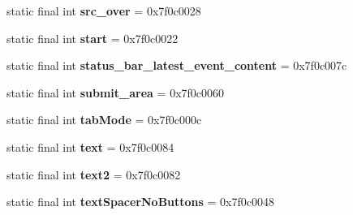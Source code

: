 \begin{DoxyCompactItemize}
\item 
\hypertarget{classandroid_1_1support_1_1design_1_1_r_1_1id_a736f123ee86e4183fcfb8bd3022ba9b8}{}static final int {\bfseries src\+\_\+over} = 0x7f0c0028\label{classandroid_1_1support_1_1design_1_1_r_1_1id_a736f123ee86e4183fcfb8bd3022ba9b8}

\item 
\hypertarget{classandroid_1_1support_1_1design_1_1_r_1_1id_a0d737859bafd47bd0319c24213bf40ba}{}static final int {\bfseries start} = 0x7f0c0022\label{classandroid_1_1support_1_1design_1_1_r_1_1id_a0d737859bafd47bd0319c24213bf40ba}

\item 
\hypertarget{classandroid_1_1support_1_1design_1_1_r_1_1id_a64ae3efa15896f2f8faa162f61413ed1}{}static final int {\bfseries status\+\_\+bar\+\_\+latest\+\_\+event\+\_\+content} = 0x7f0c007c\label{classandroid_1_1support_1_1design_1_1_r_1_1id_a64ae3efa15896f2f8faa162f61413ed1}

\item 
\hypertarget{classandroid_1_1support_1_1design_1_1_r_1_1id_ab333d43c33d6df1b253b423f4c06b51b}{}static final int {\bfseries submit\+\_\+area} = 0x7f0c0060\label{classandroid_1_1support_1_1design_1_1_r_1_1id_ab333d43c33d6df1b253b423f4c06b51b}

\item 
\hypertarget{classandroid_1_1support_1_1design_1_1_r_1_1id_a28f007351f00cb138e17395355f11f88}{}static final int {\bfseries tab\+Mode} = 0x7f0c000c\label{classandroid_1_1support_1_1design_1_1_r_1_1id_a28f007351f00cb138e17395355f11f88}

\item 
\hypertarget{classandroid_1_1support_1_1design_1_1_r_1_1id_a42faaf7f13a49213f874ef8cb4e68ee1}{}static final int {\bfseries text} = 0x7f0c0084\label{classandroid_1_1support_1_1design_1_1_r_1_1id_a42faaf7f13a49213f874ef8cb4e68ee1}

\item 
\hypertarget{classandroid_1_1support_1_1design_1_1_r_1_1id_a65e945658c4131f7246b3447a632bccf}{}static final int {\bfseries text2} = 0x7f0c0082\label{classandroid_1_1support_1_1design_1_1_r_1_1id_a65e945658c4131f7246b3447a632bccf}

\item 
\hypertarget{classandroid_1_1support_1_1design_1_1_r_1_1id_a56c833c59cf9349be24f83f9e9dea560}{}static final int {\bfseries text\+Spacer\+No\+Buttons} = 0x7f0c0048\label{classandroid_1_1support_1_1design_1_1_r_1_1id_a56c833c59cf9349be24f83f9e9dea560}


\end{DoxyCompactItemize}
